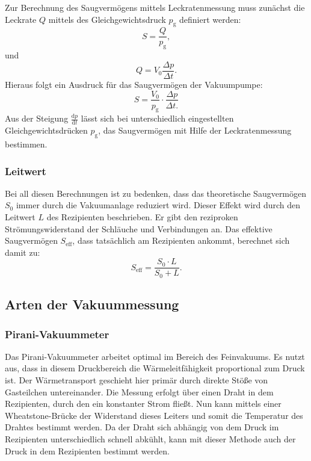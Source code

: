 			\noindent
			Zur Berechnung des Saugvermögens mittels Leckratenmessung muss zunächst die Leckrate $Q$ mittels des Gleichgewichtsdruck $p_\text{g}$ definiert werden:
			\begin{equation}
				S = \frac{Q}{p_\text{g}},
			\end{equation}
			und
			\begin{equation}
				Q = V_0 \frac{\Delta p}{\Delta t}.
			\end{equation}
			Hieraus folgt ein Ausdruck für das Saugvermögen der Vakuumpumpe:
			\begin{equation}
				S = \frac{V_0}{p_\text{g}} \cdot \frac{\Delta p}{\Delta t.}
			\end{equation}
			Aus der Steigung $\frac{\text{d}p}{\text{d}t}$ lässt sich bei unterschiedlich eingestellten Gleichgewichtsdrücken $p_\text{g}$, das Saugvermögen mit Hilfe der Leckratenmessung bestimmen.
		\subsubsection{Leitwert}

			\noindent
			Bei all diesen Berechnungen ist zu bedenken, dass das theoretische Saugvermögen $S_0$ immer durch die Vakuumanlage reduziert wird.
			Dieser Effekt wird durch den Leitwert $L$ des Rezipienten beschrieben. 
 			Er gibt den reziproken Strömungswiderstand der Schläuche und Verbindungen an.
			Das effektive Saugvermögen $S_\text{eff}$, dass tatsächlich am Rezipienten ankommt, berechnet sich damit zu:
			\begin{equation}
				S_\text{eff} = \frac{S_0 \cdot L}{S_0 + L}.
			\end{equation}

	\subsection{Arten der Vakuummessung}
		
		\subsubsection{Pirani-Vakuummeter}
			
			\noindent
			Das Pirani-Vakuummeter arbeitet optimal im Bereich des Feinvakuums.
			Es nutzt aus, dass in diesem Druckbereich die Wärmeleitfähigkeit proportional zum Druck ist. 
			Der Wärmetransport geschieht hier primär durch direkte Stöße von Gasteilchen untereinander. 
			Die Messung erfolgt über einen Draht in dem Rezipienten, durch den ein konstanter Strom fließt.
			Nun kann mittels einer Wheatstone-Brücke der Widerstand dieses Leiters und somit die Temperatur des Drahtes bestimmt werden.
			Da der Draht sich abhängig von dem Druck im Rezipienten unterschiedlich schnell abkühlt, kann mit dieser Methode auch der Druck in dem Rezipienten bestimmt werden.

